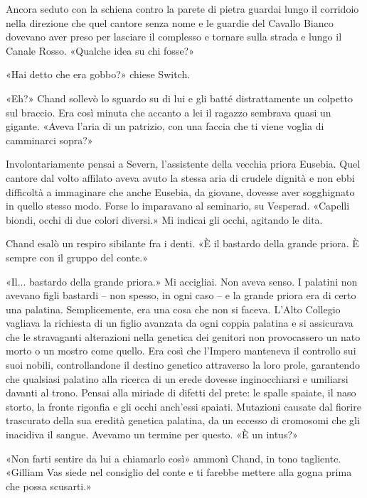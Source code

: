 Ancora seduto con la schiena contro la parete di pietra guardai lungo il
corridoio nella direzione che quel cantore senza nome e le guardie del
Cavallo Bianco dovevano aver preso per lasciare il complesso e tornare
sulla strada e lungo il Canale Rosso. «Qualche idea su chi fosse?»

«Hai detto che era gobbo?» chiese Switch.

«Eh?» Chand sollevò lo sguardo su di lui e gli batté distrattamente un
colpetto sul braccio. Era così minuta che accanto a lei il ragazzo
sembrava quasi un gigante. «Aveva l'aria di un patrizio, con una faccia
che ti viene voglia di camminarci sopra?»

Involontariamente pensai a Severn, l'assistente della vecchia priora
Eusebia. Quel cantore dal volto affilato aveva avuto la stessa aria di
crudele dignità e non ebbi difficoltà a immaginare che anche Eusebia, da
giovane, dovesse aver sogghignato in quello stesso modo. Forse lo
imparavano al seminario, su Vesperad. «Capelli biondi, occhi di due
colori diversi.» Mi indicai gli occhi, agitando le dita.

Chand esalò un respiro sibilante fra i denti. «È il bastardo della
grande priora. È sempre con il gruppo del conte.»

«Il... bastardo della grande priora.» Mi accigliai. Non aveva senso. I
palatini non avevano figli bastardi -- non spesso, in ogni caso -- e la
grande priora era di certo una palatina. Semplicemente, era una cosa che
non si faceva. L'Alto Collegio vagliava la richiesta di un figlio
avanzata da ogni coppia palatina e si assicurava che le stravaganti
alterazioni nella genetica dei genitori non provocassero un nato morto o
un mostro come quello. Era così che l'Impero manteneva il controllo sui
suoi nobili, controllandone il destino genetico attraverso la loro
prole, garantendo che qualsiasi palatino alla ricerca di un erede
dovesse inginocchiarsi e umiliarsi davanti al trono. Pensai alla miriade
di difetti del prete: le spalle spaiate, il naso storto, la fronte
rigonfia e gli occhi anch'essi spaiati. Mutazioni causate dal fiorire
trascurato della sua eredità genetica palatina, da un eccesso di
cromosomi che gli inacidiva il sangue. Avevamo un termine per questo. «È
un intus?»

«Non farti sentire da lui a chiamarlo così» ammonì Chand, in tono
tagliente. «Gilliam Vas siede nel consiglio del conte e ti farebbe
mettere alla gogna prima che possa scusarti.»

